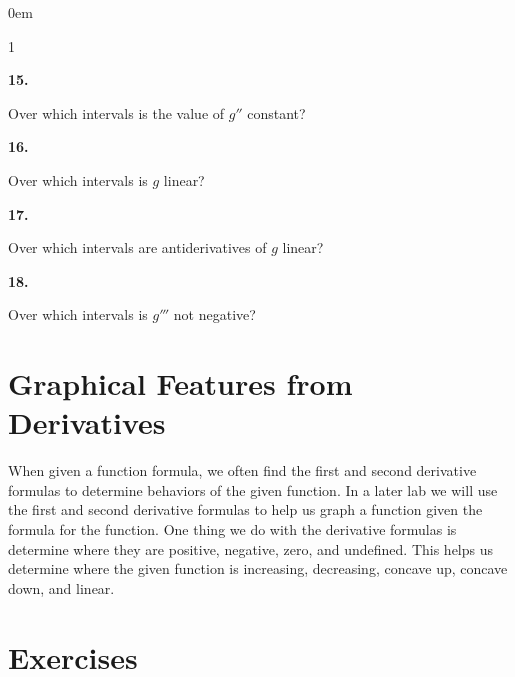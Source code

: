 \documentclass[12pt,]{book}
\theoremstyle{plain}
\theoremstyle{definition}
\numberwithin{equation}{section}
\newenvironment{exercisegroup}%
{\medskip\noindent}%
{\par\bigskip}%
\newlength{\exercisegroupindent}%
\newlength{\exercisegroupitemwidth}%
\newenvironment{exercisegrouplist}%
{\vspace{-\partopsep}%
\begin{adjustwidth}{\exercisegroupindent}{0em}}%
{\end{adjustwidth}%
\vspace{-\partopsep}%
\vspace{\baselineskip}}%
\newenvironment{exercisegroupbycol}[1]%
{\begin{exercisegrouplist}%
\vspace{-\multicolsep}%
\begin{multicols}{#1}%
\setlength{\parindent}{0em}%
\setlength{\exercisegroupitemwidth}{\linewidth}}%
{\end{multicols}%
\vspace{-\multicolsep}%
\end{exercisegrouplist}}%
\newenvironment{exercisegroupitem}[1]%
{\begin{minipage}[t]{\exercisegroupitemwidth}
\vspace{0pt}%
{\bfseries#1}%
\rule{0pt}{\baselineskip}}{\strut%
\end{minipage}%
\hspace{\columnsep}}%
\providecommand\phantomsection{}
\newcommand{\sd}[1]{#1''}
\newcommand{\td}[1]{#1'''}
\begin{document}
\begin{exercisegroup}
\begin{exercisegroupbycol}{1}
\begin{exercisegroupitem}{15. }
Over which intervals is the value of \(\sd{g}\) constant?%
\end{exercisegroupitem}%
\par%
\begin{exercisegroupitem}{16. }\phantomsection\hypertarget{exercise-256}{\null}
Over which intervals is \(g\) linear?%
\end{exercisegroupitem}%
\par%
\begin{exercisegroupitem}{17. }\phantomsection\hypertarget{exercise-257}{\null}
Over which intervals are antiderivatives of \(g\) linear?%
\end{exercisegroupitem}%
\par%
\begin{exercisegroupitem}{18. }\phantomsection\hypertarget{exercise-258}{\null}
Over which intervals is \(\td{g}\) not negative?%
\end{exercisegroupitem}%
\par%
\end{exercisegroupbycol}%
\end{exercisegroup}%
\typeout{************************************************}
\typeout{************************************************}
\section[Graphical Features from Derivatives]{Graphical Features from Derivatives}\label{section-graphical-features-from-derivatives}
When given a function formula, we  often find the first and second derivative formulas to determine behaviors of the given function.  In a later lab we will use the first and second derivative formulas to help us graph a function given the formula for the function.  One thing we do with the derivative formulas is determine where they are positive, negative, zero, and undefined. This helps us determine where the given function is increasing, decreasing, concave up, concave down, and linear.%
\typeout{************************************************}
\typeout{************************************************}
\section*{Exercises}\label{exercises-28}
\end{document}
